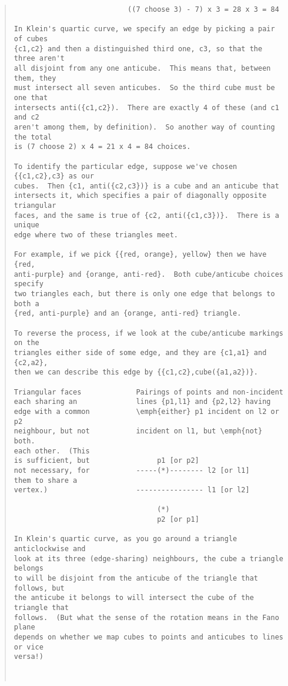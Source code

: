 \begin{quote}
\begin{verbatim}
                           ((7 choose 3) - 7) x 3 = 28 x 3 = 84

In Klein's quartic curve, we specify an edge by picking a pair of cubes 
{c1,c2} and then a distinguished third one, c3, so that the three aren't 
all disjoint from any one anticube.  This means that, between them, they 
must intersect all seven anticubes.  So the third cube must be one that 
intersects anti({c1,c2}).  There are exactly 4 of these (and c1 and c2 
aren't among them, by definition).  So another way of counting the total 
is (7 choose 2) x 4 = 21 x 4 = 84 choices.

To identify the particular edge, suppose we've chosen {{c1,c2},c3} as our 
cubes.  Then {c1, anti({c2,c3})} is a cube and an anticube that 
intersects it, which specifies a pair of diagonally opposite triangular 
faces, and the same is true of {c2, anti({c1,c3})}.  There is a unique 
edge where two of these triangles meet.

For example, if we pick {{red, orange}, yellow} then we have {red, 
anti-purple} and {orange, anti-red}.  Both cube/anticube choices specify 
two triangles each, but there is only one edge that belongs to both a 
{red, anti-purple} and an {orange, anti-red} triangle.

To reverse the process, if we look at the cube/anticube markings on the 
triangles either side of some edge, and they are {c1,a1} and {c2,a2}, 
then we can describe this edge by {{c1,c2},cube({a1,a2})}.

Triangular faces             Pairings of points and non-incident
each sharing an              lines {p1,l1} and {p2,l2} having
edge with a common           \emph{either} p1 incident on l2 or p2
neighbour, but not           incident on l1, but \emph{not} both.
each other.  (This
is sufficient, but                p1 [or p2]
not necessary, for           -----(*)-------- l2 [or l1]
them to share a
vertex.)                     ---------------- l1 [or l2]

                                  (*)
                                  p2 [or p1]

In Klein's quartic curve, as you go around a triangle anticlockwise and 
look at its three (edge-sharing) neighbours, the cube a triangle belongs 
to will be disjoint from the anticube of the triangle that follows, but 
the anticube it belongs to will intersect the cube of the triangle that 
follows.  (But what the sense of the rotation means in the Fano plane 
depends on whether we map cubes to points and anticubes to lines or vice 
versa!) 



\end{verbatim}
\end{quote}
